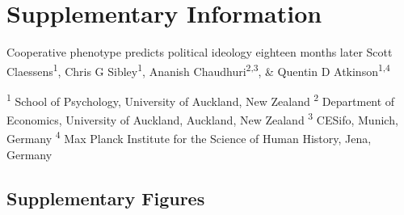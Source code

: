 \documentclass[
  man,floatsintext]{apa6}
\begin{document}
\endgroup
\newpage
\vspace*{60mm}

\renewcommand{\figurename}{Supplementary Figure}
\renewcommand{\tablename}{Supplementary Table}
\renewcommand{\thefigure}{\arabic{figure}} \setcounter{figure}{0}
\renewcommand{\thetable}{\arabic{table}} \setcounter{table}{0}
\renewcommand{\theequation}{\arabic{equation}} \setcounter{equation}{0}

\hypertarget{supplementary-information}{%
\section{\texorpdfstring{\textbf{Supplementary Information}}{Supplementary Information}}\label{supplementary-information}}

\setcounter{page}{1}
\centering

\noindent \hspace*{1cm} \small Cooperative phenotype predicts political ideology eighteen months later \newline
\hspace*{8mm} \small Scott Claessens\textsuperscript{1}, Chris G Sibley\textsuperscript{1}, Ananish Chaudhuri\textsuperscript{2,3}, \& Quentin D Atkinson\textsuperscript{1,4} \newline

\raggedright

\noindent \footnotesize \textsuperscript{1} School of Psychology, University of Auckland, New Zealand \newline
\noindent \footnotesize \textsuperscript{2} Department of Economics, University of Auckland, Auckland, New Zealand \newline
\noindent \footnotesize \textsuperscript{3} CESifo, Munich, Germany \newline
\noindent \footnotesize \textsuperscript{4} Max Planck Institute for the Science of Human History, Jena, Germany \newline
\normalsize
\newpage

\hypertarget{supplementary-figures}{%
\subsection{Supplementary Figures}\label{supplementary-figures}}
\end{document}
